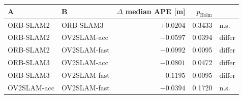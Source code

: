 \begin{tabular}{llrrl}
\toprule
A & B & $\Delta$ median APE [m] & $p_{\mathrm{Holm}}$ & \\
\midrule
ORB-SLAM2 & ORB-SLAM3 & $+0.0204$ & 0.3433 & n.s. \\
ORB-SLAM2 & OV2SLAM-acc & $-0.0597$ & 0.0394 & differ \\
ORB-SLAM2 & OV2SLAM-fast & $-0.0992$ & 0.0095 & differ \\
ORB-SLAM3 & OV2SLAM-acc & $-0.0801$ & 0.0472 & differ \\
ORB-SLAM3 & OV2SLAM-fast & $-0.1195$ & 0.0095 & differ \\
OV2SLAM-acc & OV2SLAM-fast & $-0.0394$ & 0.1720 & n.s. \\
\bottomrule
\end{tabular}
